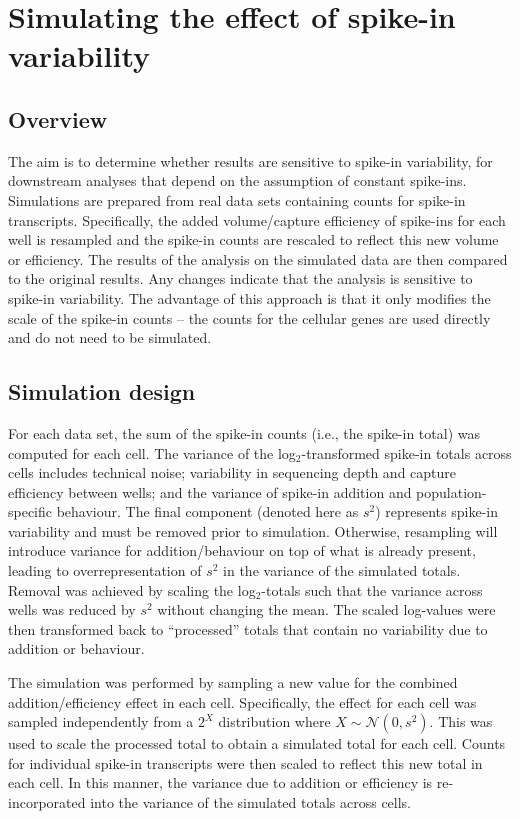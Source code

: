 \documentclass{article}
\begin{document}
\newpage

\section{Simulating the effect of spike-in variability}

\subsection{Overview}
The aim is to determine whether results are sensitive to spike-in variability, for downstream analyses that depend on the assumption of constant spike-ins.
Simulations are prepared from real data sets containing counts for spike-in transcripts.
Specifically, the added volume/capture efficiency of spike-ins for each well is resampled and the spike-in counts are rescaled to reflect this new volume or efficiency.
The results of the analysis on the simulated data are then compared to the original results.
Any changes indicate that the analysis is sensitive to spike-in variability.
The advantage of this approach is that it only modifies the scale of the spike-in counts -- the counts for the cellular genes are used directly and do not need to be simulated.

\subsection{Simulation design}
For each data set, the sum of the spike-in counts (i.e., the spike-in total) was computed for each cell.
The variance of the log$_2$-transformed spike-in totals across cells includes technical noise; variability in sequencing depth and capture efficiency between wells; and the variance of spike-in addition and population-specific behaviour.
The final component (denoted here as $s^2$) represents spike-in variability and must be removed prior to simulation.
Otherwise, resampling will introduce variance for addition/behaviour on top of what is already present, leading to overrepresentation of $s^2$ in the variance of the simulated totals.
Removal was achieved by scaling the log$_2$-totals such that the variance across wells was reduced by $s^2$ without changing the mean.
The scaled log-values were then transformed back to ``processed'' totals that contain no variability due to addition or behaviour.

The simulation was performed by sampling a new value for the combined addition/efficiency effect in each cell.
Specifically, the effect for each cell was sampled independently from a $2^X$ distribution where $X \sim \mathcal{N}(0, s^2)$.
This was used to scale the processed total to obtain a simulated total for each cell.
Counts for individual spike-in transcripts were then scaled to reflect this new total in each cell.
In this manner, the variance due to addition or efficiency is re-incorporated into the variance of the simulated totals across cells.
\end{document}
